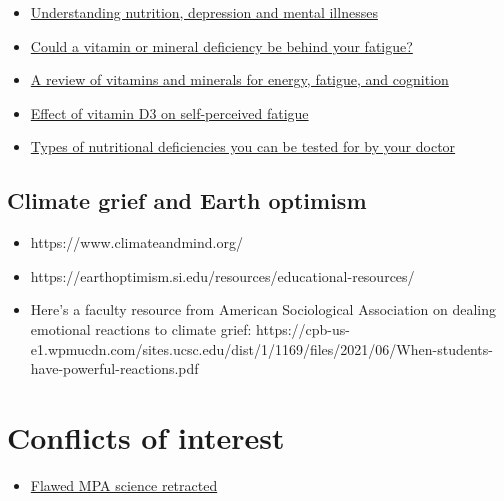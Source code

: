 \documentclass[
  letterpaper,
  DIV=11,
  numbers=noendperiod]{scrreprt}
\providecommand{\tightlist}{%
  \setlength{\itemsep}{0pt}\setlength{\parskip}{0pt}}\usepackage{longtable,booktabs,array}
\begin{document}
\begin{itemize}
\item
  \href{https://www.ncbi.nlm.nih.gov/pmc/articles/PMC2738337/}{Understanding
  nutrition, depression and mental illnesses}
\item
  \href{https://www.health.harvard.edu/mind-and-mood/could-a-vitamin-or-mineral-deficiency-be-behind-your-fatigue}{Could
  a vitamin or mineral deficiency be behind your fatigue?}
\item
  \href{https://www.ncbi.nlm.nih.gov/pmc/articles/PMC7019700/}{A review
  of vitamins and minerals for energy, fatigue, and cognition}
\item
  \href{https://www.ncbi.nlm.nih.gov/pmc/articles/PMC5207540/}{Effect of
  vitamin D3 on self-perceived fatigue}
\item
  \href{https://www.myonemedicalsource.com/2020/06/18/nutritional-testing/}{Types
  of nutritional deficiencies you can be tested for by your doctor}
\end{itemize}

\hypertarget{climate-grief-and-earth-optimism}{%
\subsection*{\texorpdfstring{\textbf{Climate grief and Earth
optimism}}{Climate grief and Earth optimism}}\label{climate-grief-and-earth-optimism}}

\begin{itemize}
\item
  https://www.climateandmind.org/
\item
  https://earthoptimism.si.edu/resources/educational-resources/
\item
  Here's a faculty resource from American Sociological Association on
  dealing emotional reactions to climate grief:
  https://cpb-us-e1.wpmucdn.com/sites.ucsc.edu/dist/1/1169/files/2021/06/When-students-have-powerful-reactions.pdf
\end{itemize}

\hypertarget{conflicts-of-interest}{%
\section*{\texorpdfstring{\textbf{Conflicts of
interest}}{Conflicts of interest}}\label{conflicts-of-interest}}

\begin{itemize}
\tightlist
\item
  \href{https://sustainablefisheries-uw.org/flawed-mpa-science-retracted/}{Flawed
  MPA science retracted}
\end{itemize}
\end{document}
